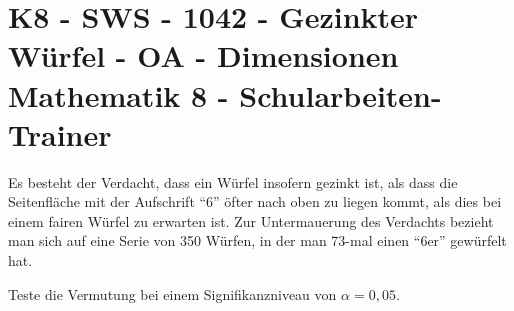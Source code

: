 \section{K8 - SWS - 1042 - Gezinkter Würfel - OA - Dimensionen Mathematik 8 - Schularbeiten-Trainer}

\begin{beispiel}[K8 - SWS]{1}
Es besteht der Verdacht, dass ein Würfel insofern gezinkt ist, als dass die Seitenfläche mit der Aufschrift "`6"' öfter nach oben zu liegen kommt, als dies bei einem fairen Würfel zu erwarten ist. Zur Untermauerung des Verdachts bezieht man sich auf eine Serie von 350 Würfen, in der man 73-mal einen "`6er"' gewürfelt hat.

Teste die Vermutung bei einem Signifikanzniveau von $\alpha=0,05$.

\end{beispiel}